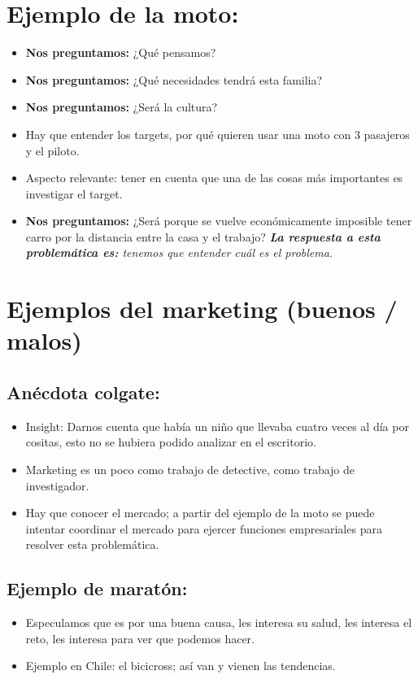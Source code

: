 \section{Ejemplo de la moto:}
\begin{itemize}
    \item \textbf{Nos preguntamos:} ¿Qué pensamos?
    \item \textbf{Nos preguntamos:} ¿Qué necesidades tendrá esta familia? 
    \item \textbf{Nos preguntamos:} ¿Será la cultura?
    \item Hay que entender los targets, por qué quieren usar una moto con 3 pasajeros y el piloto.
    \item Aspecto relevante: tener en cuenta que una de las cosas más importantes es investigar el target.
    \item \textbf{Nos preguntamos:} ¿Será porque se vuelve económicamente imposible tener carro por la distancia entre la casa y el trabajo? \emph{\textbf{La respuesta a esta problemática es: }tenemos que entender cuál es el problema.}
\end{itemize}

\section{Ejemplos del marketing (buenos / malos)}
\subsection{Anécdota colgate:}
\begin{itemize}
    \item Insight: Darnos cuenta que había un niño que llevaba cuatro veces al día por cositas, esto no se hubiera podido analizar en el escritorio.
    \item Marketing es un poco como trabajo de detective, como trabajo de investigador.
    \item Hay que conocer el mercado; a partir del ejemplo de la moto se puede intentar coordinar el mercado para ejercer funciones empresariales para resolver esta problemática.
\end{itemize}

\subsection{Ejemplo de maratón:}
\begin{itemize}
    \item Especulamos que es por una buena causa, les interesa su salud, les interesa el reto, les interesa para ver que podemos hacer.
    \item Ejemplo en Chile: el bicicross;  así van y vienen las tendencias.
\end{itemize}

